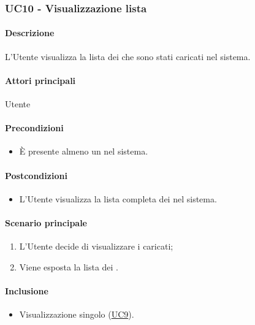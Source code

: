 \subsubsection{UC10 - Visualizzazione lista }\label{UC10}
\paragraph*{Descrizione}
L’Utente visualizza la lista dei  che sono stati caricati nel sistema.

\paragraph*{Attori principali}
Utente

\paragraph*{Precondizioni}
\begin{itemize}
  \item È presente almeno un  nel sistema.  
\end{itemize}

\paragraph*{Postcondizioni}
\begin{itemize}
  \item L’Utente visualizza la lista completa dei  nel sistema.
\end{itemize}

\paragraph*{Scenario principale}
\begin{enumerate}
  \item L’Utente decide di visualizzare i  caricati;
  \item Viene esposta la lista dei .
\end{enumerate}

\paragraph*{Inclusione}
\begin{itemize}
  \item Visualizzazione singolo  (\hyperref[UC9]{UC9}).
\end{itemize}

